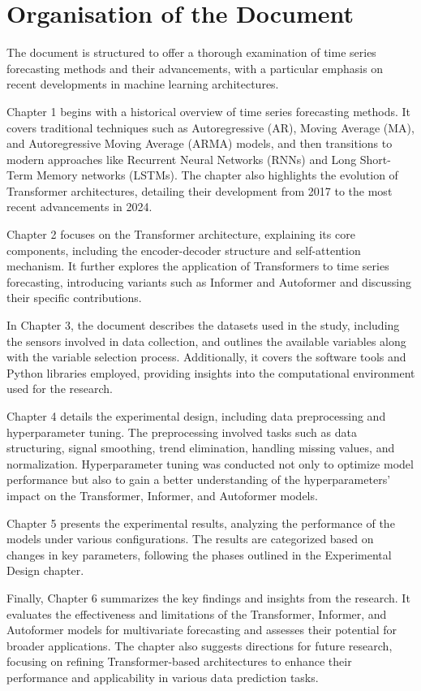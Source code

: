 \section{Organisation of the Document}

The document is structured to offer a thorough examination of time series forecasting methods and their advancements, with a particular emphasis on recent developments in machine learning architectures.

Chapter 1 begins with a historical overview of time series forecasting methods. It covers traditional techniques such as Autoregressive (AR), Moving Average (MA), and Autoregressive Moving Average (ARMA) models, and then transitions to modern approaches like Recurrent Neural Networks (RNNs) and Long Short-Term Memory networks (LSTMs). The chapter also highlights the evolution of Transformer architectures, detailing their development from 2017 to the most recent advancements in 2024.

Chapter 2 focuses on the Transformer architecture, explaining its core components, including the encoder-decoder structure and self-attention mechanism. It further explores the application of Transformers to time series forecasting, introducing variants such as Informer and Autoformer and discussing their specific contributions.

In Chapter 3, the document describes the datasets used in the study, including the sensors involved in data collection, and outlines the available variables along with the variable selection process. Additionally, it covers the software tools and Python libraries employed, providing insights into the computational environment used for the research.

Chapter 4 details the experimental design, including data preprocessing and hyperparameter tuning. The preprocessing involved tasks such as data structuring, signal smoothing, trend elimination, handling missing values, and normalization. Hyperparameter tuning was conducted not only to optimize model performance but also to gain a better understanding of the hyperparameters' impact on the Transformer, Informer, and Autoformer models.

Chapter 5 presents the experimental results, analyzing the performance of the models under various configurations. The results are categorized based on changes in key parameters, following the phases outlined in the Experimental Design chapter.

Finally, Chapter 6 summarizes the key findings and insights from the research. It evaluates the effectiveness and limitations of the Transformer, Informer, and Autoformer models for multivariate forecasting and assesses their potential for broader applications. The chapter also suggests directions for future research, focusing on refining Transformer-based architectures to enhance their performance and applicability in various data prediction tasks.

